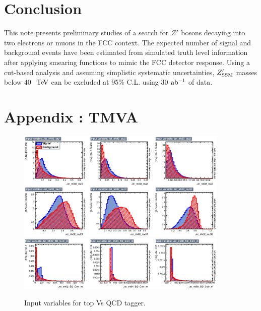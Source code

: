 \documentclass{cernrep}
\begin{document}

\section{Conclusion}
This note presents preliminary studies of a search for $Z^{\prime}$ 
bosons decaying into two electrons or muons in the FCC context. The expected number 
of signal and background events have been estimated from simulated truth level information 
after applying smearing functions to mimic the FCC detector response.
Using a cut-based analysis and assuming simplistic systematic uncertainties, $Z^{\prime}_{\mathrm{SSM}}$
masses below 40 $\TeV$ can be excluded at 95$\%$ C.L. 
using 30 $\mbox{ab$^{-1}$}{}$ of data. 
\clearpage
\newpage

\appendix

\section{ Appendix : TMVA}
\label{appendix:tmva}

\begin{figure}[!htb]\centering
\includegraphics[width=0.9\textwidth]{Fig/TMVA/thad_vs_QCD/variables_id_c1.eps}
\includegraphics[width=0.9\textwidth,trim={0 5cm 0 0},clip]{Fig/TMVA/thad_vs_QCD/variables_id_c2.eps}
\caption{Input variables for top Vs QCD tagger.}
\label{fig:TMVA_inputs_t}
\end{figure}
\end{document}
